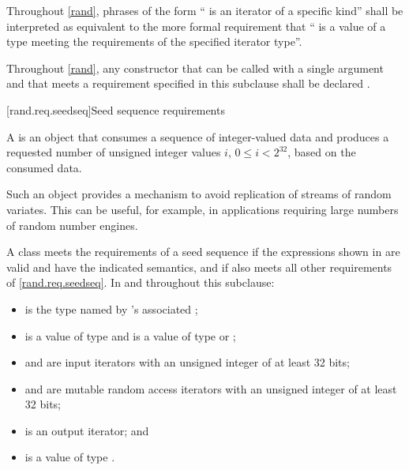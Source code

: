 \pnum
Throughout \ref{rand},
phrases of the form `` is an iterator of a specific kind''
shall be interpreted as equivalent to the more formal requirement that
`` is a value
of a type meeting the requirements
of the specified iterator type''.

\pnum
Throughout \ref{rand},
any constructor that can be called with a single argument
and that meets a requirement specified in this subclause
shall be declared .


[rand.req.seedseq]{Seed sequence requirements}%
%

\pnum
 A 
 is an object
 that consumes a sequence
 of integer-valued data
 and produces a requested number
 of unsigned integer values $i$, $0 \le i < 2^{32}$,
 based on the consumed data.
\begin{note}
 Such an object provides a mechanism
 to avoid replication of streams of random variates.
 This can be useful, for example, in applications
 requiring large numbers of random number engines.
\end{note}

\pnum
A class 
meets the requirements
of a seed sequence
if the expressions shown
in 
are valid and have the indicated semantics,
and if  also meets all other requirements
of \ref{rand.req.seedseq}.
In  and throughout this subclause:
\begin{itemize}
  \item
     is the type named by
    's associated ;
  \item
     is a value of type 
    and
     is a value of type  or ;
  \item
     and  are input iterators
    with an unsigned integer  of at least 32 bits;
  \item
     and  are mutable random access iterators
    with an unsigned integer  of at least 32 bits;
  \item
     is an output iterator;
  and
  \item
     is a value of type .
\end{itemize}


